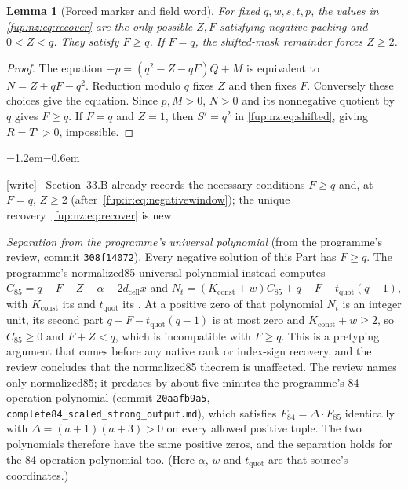 \documentclass[11pt,letterpaper]{article}
\newtheorem{lemma}[theorem]{Lemma}
\theoremstyle{definition}\newtheorem{definition}[theorem]{Definition}
\theoremstyle{remark}\newtheorem{remark}[theorem]{Remark}
\newcommand{\code}[1]{\texttt{\detokenize{#1}}}
\newcommand{\dcell}{d_{\mathrm{cell}}}
\newcommand{\wtag}{\textup{[write]}}
\newenvironment{writenote}{\par\smallskip\begin{list}{}{\leftmargin=1.2em\rightmargin=0.6em}\item[]\small\wtag\ }{\end{list}\smallskip}
\newcommand{\rw}[1]{\nolinkurl{#1}}%
\begin{document}
\begin{lemma}[Forced marker and field word]\label{fup:nz:lem:packing}
For fixed $q,w,s,t,p$, the values in \eqref{fup:nz:eq:recover} are the only possible $Z,F$ satisfying negative packing and $0<Z<q$. They satisfy $F\ge q$. If $F=q$, the shifted-mask remainder forces $Z\ge2$.
\end{lemma}
\begin{proof}
The equation $-p=(q^2-Z-qF)Q+M$ is equivalent to $N=Z+qF-q^2$. Reduction modulo $q$ fixes $Z$ and then fixes $F$. Conversely these choices give the equation. Since $p,M>0$, $N>0$ and its nonnegative quotient by $q$ gives $F\ge q$. If $F=q$ and $Z=1$, then $S'=q^2$ in \eqref{fup:nz:eq:shifted}, giving $R=T'>0$, impossible.
\end{proof}
\begin{writenote}
Section~33.B already records the necessary conditions $F\ge q$ and, at $F=q$, $Z\ge2$ (after~\eqref{fup:ir:eq:negativewindow}); the unique recovery~\eqref{fup:nz:eq:recover} is new.

\emph{Separation from the programme's universal polynomial} (from the programme's review, commit \texttt{308f14072}). Every negative solution of this Part has $F\ge q$. The programme's normalized85 universal polynomial instead computes $C_{85}=q-F-Z-\alpha-2\dcell x$ and $N_t=(K_{\mathrm{const}}+w)C_{85}+q-F-t_{\mathrm{quot}}(q-1)$, with $K_{\mathrm{const}}$ its \code{Kconstant} and $t_{\mathrm{quot}}$ its \code{tquot}. At a positive zero of that polynomial $N_t$ is an integer unit, its second part $q-F-t_{\mathrm{quot}}(q-1)$ is at most zero and $K_{\mathrm{const}}+w\ge2$, so $C_{85}\ge0$ and $F+Z<q$, which is incompatible with $F\ge q$. This is a pretyping argument that comes before any native rank or index-sign recovery, and the review concludes that the normalized85 theorem is unaffected. The review names only normalized85; it predates by about five minutes the programme's 84-operation polynomial (commit \texttt{20aafb9a5}, \rw{complete84_scaled_strong_output.md}), which satisfies $F_{84}=\Delta\cdot F_{85}$ identically with $\Delta=(a+1)(a+3)>0$ on every allowed positive tuple. The two polynomials therefore have the same positive zeros, and the separation holds for the 84-operation polynomial too. (Here $\alpha$, $w$ and $t_{\mathrm{quot}}$ are that source's coordinates.)
\end{writenote}
\end{document}
